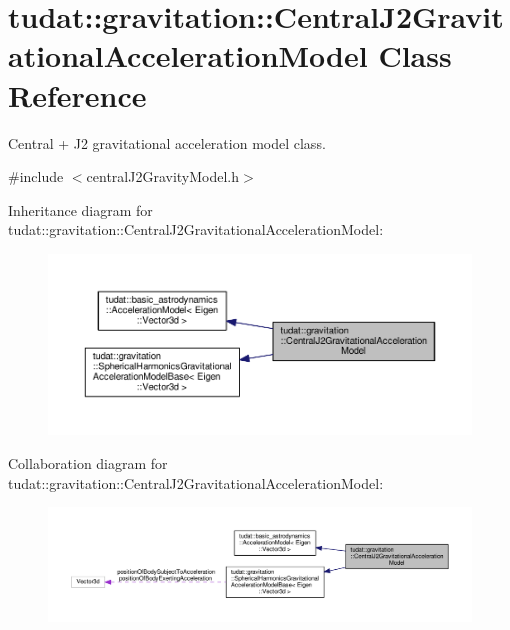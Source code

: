 \hypertarget{classtudat_1_1gravitation_1_1CentralJ2GravitationalAccelerationModel}{}\section{tudat\+:\+:gravitation\+:\+:Central\+J2\+Gravitational\+Acceleration\+Model Class Reference}
\label{classtudat_1_1gravitation_1_1CentralJ2GravitationalAccelerationModel}


Central + J2 gravitational acceleration model class.  




{\ttfamily \#include $<$central\+J2\+Gravity\+Model.\+h$>$}



Inheritance diagram for tudat\+:\+:gravitation\+:\+:Central\+J2\+Gravitational\+Acceleration\+Model\+:
\nopagebreak
\begin{figure}[H]
\begin{center}
\leavevmode
\includegraphics[width=350pt]{classtudat_1_1gravitation_1_1CentralJ2GravitationalAccelerationModel__inherit__graph}
\end{center}
\end{figure}


Collaboration diagram for tudat\+:\+:gravitation\+:\+:Central\+J2\+Gravitational\+Acceleration\+Model\+:
\nopagebreak
\begin{figure}[H]
\begin{center}
\leavevmode
\includegraphics[width=350pt]{classtudat_1_1gravitation_1_1CentralJ2GravitationalAccelerationModel__coll__graph}
\end{center}
\end{figure}
